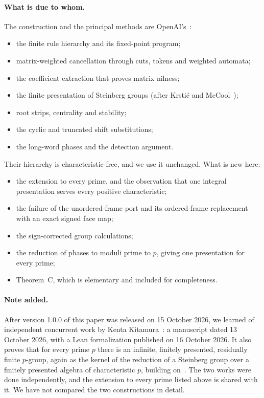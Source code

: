 \documentclass[11pt]{article}
\numberwithin{equation}{section}
\theoremstyle{definition}
\theoremstyle{remark}
\begin{document}
\paragraph{What is due to whom.} The construction and the principal methods are OpenAI's~\cite{OAI247periodic,OAI247rf}:
\begin{itemize}[leftmargin=*]
\item the finite rule hierarchy and its fixed-point program;
\item matrix-weighted cancellation through cuts, tokens and weighted automata;
\item the coefficient extraction that proves matrix nilness;
\item the finite presentation of Steinberg groups (after Krsti\'c and McCool~\cite{KrsticMcCool});
\item root strips, centrality and stability;
\item the cyclic and truncated shift substitutions;
\item the long-word phases and the detection argument.
\end{itemize}
Their hierarchy is characteristic-free, and we use it unchanged. What is new here:
\begin{itemize}[leftmargin=*]
\item the extension to every prime, and the observation that one integral presentation serves every positive
  characteristic;
\item the failure of the unordered-frame port and its ordered-frame replacement with an exact signed face map;
\item the sign-corrected group calculations;
\item the reduction of phases to moduli prime to $p$, giving one presentation for every prime;
\item Theorem~C, which is elementary and included for completeness.
\end{itemize}

\paragraph{Note added.} After version 1.0.0 of this paper was released on 15 October 2026, we learned of independent
concurrent work by Kenta Kitamura~\cite{Kitamura2026}: a manuscript dated 13 October 2026, with a Lean formalization
published on 16 October 2026. It also proves that for every prime $p$ there is an infinite, finitely presented,
residually finite $p$-group, again as the kernel of the reduction of a Steinberg group over a finitely presented algebra
of characteristic $p$, building on~\cite{OAI247periodic,OAI247rf}. The two works were done independently, and the
extension to every prime listed above is shared with it. We have not compared the two constructions in detail.
\end{document}
